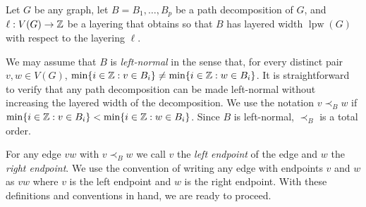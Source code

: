 \documentclass{patmorin}
\DeclareMathOperator{\lpw}{lpw}
\begin{document}
Let $G$ be any graph, let $B=B_1,\ldots,B_p$ be a path decomposition of $G$, and $\ell:V(G)\to\mathbb{Z}$ be a layering that obtains so that $B$ has layered width $\lpw(G)$ with respect to the layering $\ell$.

We may assume that $B$ is \emph{left-normal} in the sense that, for every distinct pair $v,w\in V(G)$, $\min\{i\in\mathbb{Z} : v\in B_i\} \neq \min\{i\in\mathbb{Z}:w\in B_i\}$. It is straightforward to verify that any path decomposition can be made left-normal without increasing the layered width of the decomposition.
We use the notation $v\prec_B w$ if $\min\{i\in\mathbb{Z} : v\in B_i\} < \min\{i\in\mathbb{Z}:w\in B_i\}$.  Since $B$ is left-normal, $\prec_B$ is a total order.

For any edge $vw$ with $v\prec_B w$ we call $v$ the \emph{left endpoint} of the edge and $w$ the \emph{right endpoint}.  We use the convention of writing any edge with endpoints $v$ and $w$ as $vw$ where $v$ is the left endpoint and $w$ is the right endpoint.  With these definitions and conventions in hand, we are ready to proceed.
\end{document}
